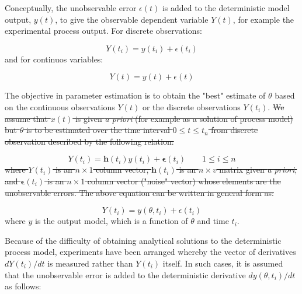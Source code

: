 \documentclass[../Parameter_fitting.tex]{subfiles}
\begin{document}
	
Conceptually, the unobservable error $\epsilon(t)$ is added to the deterministic model output, $y(t)$, to give the observable dependent variable $Y(t)$, for example the experimental process output. For discrete observations:

{\footnotesize
	\begin{equation}
		Y(t_i) = y(t_i) + \epsilon(t_i)
\end{equation} }
and for continuos variables:

{\footnotesize
	\begin{equation}
		Y(t) = y(t) + \epsilon(t)
\end{equation} }

The objective in parameter estimation is to obtain the "best" estimate of $\theta$ based on the continuous observations $Y(t)$ or the discrete observations $Y(t_i)$. 
\sout{
	We assume that $x(t)$ is given \textit{a priori} (for example as a solution of process model) but $\theta$ is to be estimated over the time interval $0 \leq t \leq t_n$ from discrete observation described by the following relation:}

{\footnotesize
	\begin{equation}
		Y(t_i) = \textbf{h}(t_i)y(t_i) + \boldsymbol{\epsilon}(t_i) \qquad 1 \leq i \leq n
\end{equation} }
\sout{where $ Y(t_i)$ is an $n \times 1$ column vector, $\textbf{h}(t_i)$ is an $n \times v$ matrix given \textit{a priori}, and $ \boldsymbol{\epsilon} (t_i)$ is an $n \times 1$ column vector ("noise" vector) whose elements are the unobservable errors. The above equation can be written in general form as:}

{\footnotesize
	\begin{equation} \label{EQ: Measurment_noise}
		Y(t_i) = y(\theta, t_i) + \epsilon(t_i)
\end{equation}}
where $y$ is the output model, which is a function of $\theta$ and time $t_i$.

Because of the difficulty of obtaining analytical solutions to the deterministic process model, experiments have been arranged whereby the vector of derivatives $d Y(t_i)/dt$ is measured rather than $Y(t_i)$ itself. In such cases, it is assumed that the unobservable error is added to the deterministic derivative $dy(\theta, t_i)/dt$ as follows:
\end{document}
